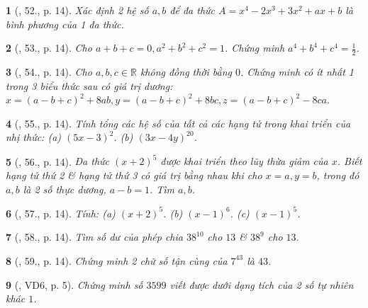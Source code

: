 \documentclass{article}
\newtheorem{baitoan}{}
\begin{document}
\begin{baitoan}[\cite{Tuyen_Toan_8}, 52., p. 14]
	Xác định 2 hệ số $a,b$ để đa thức $A = x^4 - 2x^3 + 3x^2 + ax + b$ là bình phương của 1 đa thức.
\end{baitoan}

\begin{baitoan}[\cite{Tuyen_Toan_8}, 53., p. 14]
	Cho $a + b + c = 0,a^2 + b^2 + c^2 = 1$. Chứng minh $a^4 + b^4 + c^4 = \frac{1}{2}$.
\end{baitoan}

\begin{baitoan}[\cite{Tuyen_Toan_8}, 54., p. 14]
	Cho $a,b,c\in\mathbb{R}$ không đồng thời bằng $0$. Chứng minh có ít nhất 1 trong 3 biểu thức sau có giá trị dương: $x = (a - b + c)^2 + 8ab,y = (a - b + c)^2 + 8bc,z = (a - b + c)^2 - 8ca$.
\end{baitoan}

\begin{baitoan}[\cite{Tuyen_Toan_8}, 55., p. 14]
	Tính tổng các hệ số của tất cả các hạng tử trong khai triển của nhị thức: (a) $(5x - 3)^2$. (b) $(3x - 4y)^{20}$.
\end{baitoan}

\begin{baitoan}[\cite{Tuyen_Toan_8}, 56., p. 14]
	Đa thức $(x + 2)^5$ được khai triển theo lũy thừa giảm của $x$. Biết hạng tử thứ 2 \& hạng tử thứ 3 có giá trị bằng nhau khi cho $x = a,y = b$, trong đó $a,b$ là 2 số thực dương, $a - b = 1$. Tìm $a,b$.
\end{baitoan}

\begin{baitoan}[\cite{Tuyen_Toan_8}, 57., p. 14]
	Tính: (a) $(x + 2)^5$. (b) $(x - 1)^6$. (c) $(x - 1)^5$.
\end{baitoan}

\begin{baitoan}[\cite{Tuyen_Toan_8}, 58., p. 14]
	Tìm số dư của phép chia $38^{10}$ cho $13$ \& $38^9$ cho $13$.
\end{baitoan}

\begin{baitoan}[\cite{Tuyen_Toan_8}, 59., p. 14]
	Chứng minh 2 chữ số tận cùng của $7^{43}$ là $43$.
\end{baitoan}

\begin{baitoan}[\cite{Binh_Toan_8_tap_1}, VD6, p. 5]
	Chứng minh số $3599$ viết được dưới dạng tích của 2 số tự nhiên khác $1$.
\end{baitoan}
\end{document}
